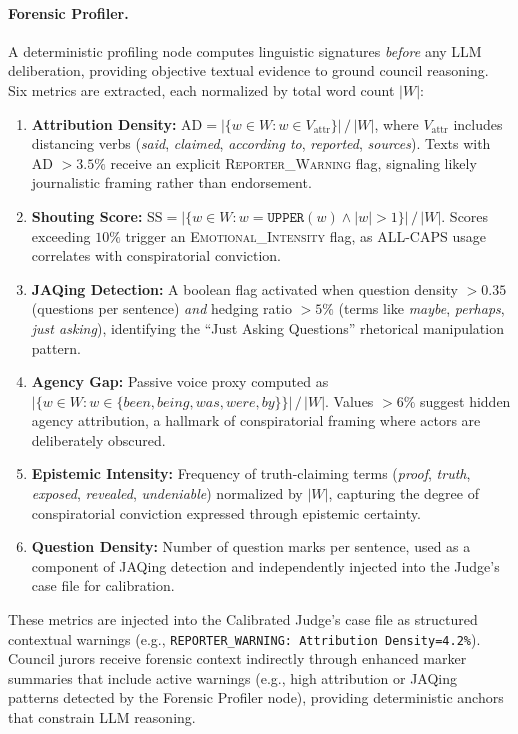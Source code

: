 \documentclass[11pt]{article}
\begin{document}
\paragraph{Forensic Profiler.} A deterministic profiling node computes linguistic signatures \textit{before}
any LLM deliberation, providing objective textual evidence to ground council
reasoning. Six metrics are extracted, each normalized by total word count
$|W|$:
\begin{enumerate}
	\item \textbf{Attribution Density:} $\text{AD} = |\{w \in W : w \in
		      V_{\text{attr}}\}| \,/\, |W|$, where $V_{\text{attr}}$ includes
	      distancing verbs (\textit{said}, \textit{claimed}, \textit{according
		      to}, \textit{reported}, \textit{sources}). Texts with AD $> 3.5\%$
	      receive an explicit \textsc{Reporter\_Warning} flag, signaling likely
	      journalistic framing rather than endorsement.
	\item \textbf{Shouting Score:} $\text{SS} = |\{w \in W : w =
		      \texttt{UPPER}(w) \land |w| > 1\}| \,/\, |W|$. Scores exceeding $10\%$
	      trigger an \textsc{Emotional\_Intensity} flag, as ALL-CAPS usage
	      correlates with conspiratorial conviction.
	\item \textbf{JAQing Detection:} A boolean flag activated when question
	      density $> 0.35$ (questions per sentence) \textit{and} hedging ratio
	      $> 5\%$ (terms like \textit{maybe}, \textit{perhaps}, \textit{just
		      asking}), identifying the ``Just Asking Questions'' rhetorical
	      manipulation pattern.
	\item \textbf{Agency Gap:} Passive voice proxy computed as $|\{w \in W : w
		      \in \{\textit{been}, \textit{being}, \textit{was}, \textit{were},
		      \textit{by}\}\}| \,/\, |W|$. Values $> 6\%$ suggest hidden agency
	      attribution, a hallmark of conspiratorial framing where actors are
	      deliberately obscured.
	\item \textbf{Epistemic Intensity:} Frequency of truth-claiming terms
	      (\textit{proof}, \textit{truth}, \textit{exposed}, \textit{revealed},
	      \textit{undeniable}) normalized by $|W|$, capturing the degree of
	      conspiratorial conviction expressed through epistemic certainty.
	\item \textbf{Question Density:} Number of question marks per sentence,
	      used as a component of JAQing detection and independently injected
	      into the Judge's case file for calibration.
\end{enumerate}
These metrics are injected into the Calibrated Judge's case file as structured
contextual warnings (e.g., \texttt{REPORTER\_WARNING: Attribution
	Density=4.2\%}). Council jurors receive forensic context indirectly through
enhanced marker summaries that include active warnings (e.g., high attribution
or JAQing patterns detected by the Forensic Profiler node), providing
deterministic anchors that constrain LLM reasoning.
\end{document}
